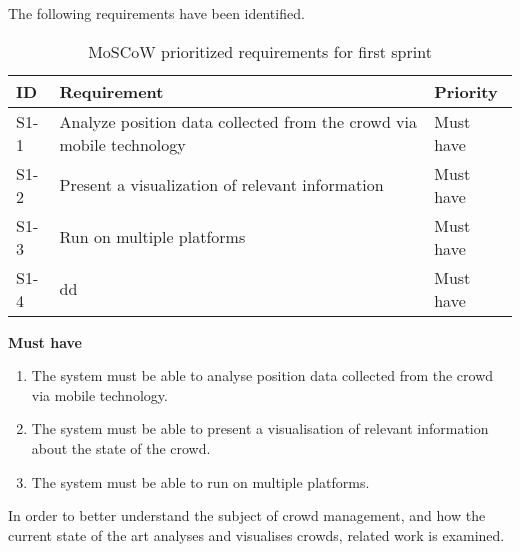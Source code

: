 The following requirements have been identified.

\begin{table}[h!]
	\centering
	\begin{tabularx}{\textwidth}{lXl}
		\toprule
		\textbf{ID} & \textbf{Requirement} & \textbf{Priority} \\
		\midrule 
		\rowcolor[HTML]{EFEFEF} 
		S1-1  & Analyze position data collected from the crowd via mobile technology    & Must have \\
		S1-2  & Present a visualization of relevant information                         & Must have \\
		\rowcolor[HTML]{EFEFEF} 
		S1-3  & Run on multiple platforms                                               & Must have \\
		S1-4  & dd                                                                      & Must have \\
		\bottomrule
	\end{tabularx}
	\caption{MoSCoW prioritized requirements for first sprint}
	\label{tab:s1_req}
\end{table}


\textbf{Must have}
\begin{enumerate}
    \item The system must be able to analyse position data collected from the crowd via mobile technology.
    \item The system must be able to present a visualisation of relevant information about the state of the crowd.
    \item The system must be able to run on multiple platforms.
\end{enumerate}

In order to better understand the subject of crowd management, and how the current state of the art analyses and visualises crowds, related work is examined.

